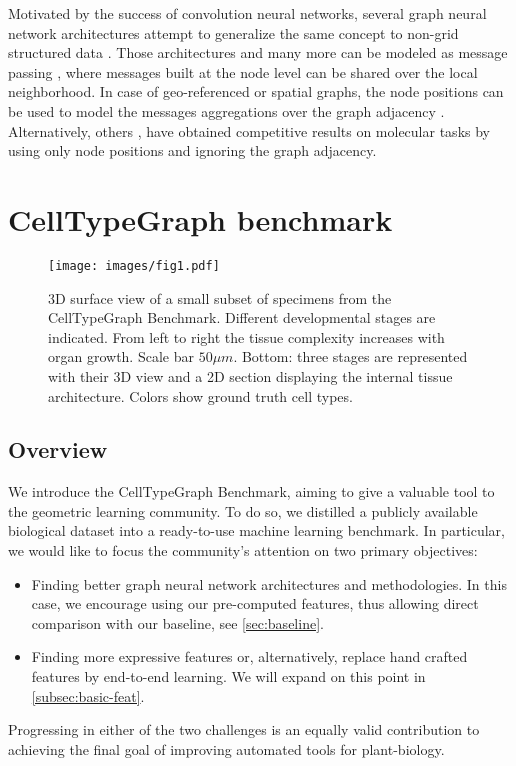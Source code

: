 \documentclass[10pt,twocolumn,letterpaper]{article}
\begin{document}
Motivated by the success of convolution neural networks, several graph neural network architectures attempt to generalize the same concept to non-grid structured data \cite{kipf2016semi, defferrard2016convolutional, he2021bernnet}. Those architectures and many more \cite{velickovic2018graph, hamilton2017inductive, xu2018powerful, pmlr-v97-wu19e, chen2020simple, li2019deepgcns, li2020deepergcn, brody2021attentive} can be modeled as message passing \cite{gilmer2017neural}, where messages built at the node level can be shared over the local neighborhood.
In case of geo-referenced or spatial graphs, the node positions can be used to model the messages aggregations over the graph adjacency \cite{danel2020spatial, de2020gauge}. Alternatively, others \cite{schutt2017schnet, unke2019physnet}, have obtained competitive results on molecular tasks by using only node positions and ignoring the graph adjacency.


\section{CellTypeGraph benchmark}

\begin{figure*}
  \centering
  \texttt{[image: images/fig1.pdf]}
  \caption{3D surface view of a small subset of specimens from the CellTypeGraph Benchmark. Different developmental stages are indicated. From left to right the tissue complexity increases with organ growth. Scale bar $50 \mu m$.
 Bottom: three stages are represented with their 3D view and a 2D section displaying the internal tissue architecture. Colors show ground truth cell types.}
  \label{fig:main}
\end{figure*}

\subsection{Overview}
We introduce the CellTypeGraph Benchmark, aiming to give a valuable tool to the geometric learning community. To do so, we distilled a publicly available biological dataset \cite{vijayan2021digital} into a ready-to-use machine learning benchmark.
In particular, we would like to focus the community's attention on two primary objectives:
\begin{itemize}
    \item Finding better graph neural network architectures and methodologies. In this case, we encourage using our pre-computed features, thus allowing direct comparison with our baseline, see \cref{sec:baseline}.
    \item Finding more expressive features or, alternatively, replace hand crafted features by end-to-end learning. We will expand on this point in \cref{subsec:basic-feat}.
\end{itemize} 
Progressing in either of the two challenges is an equally valid contribution to achieving the final goal of improving automated tools for plant-biology.
\end{document}
